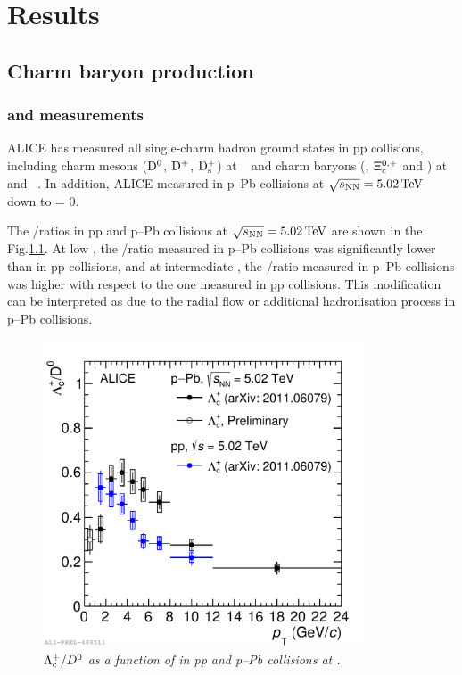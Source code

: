 \chapter{Results}
\section{Charm baryon production}
\subsection{\Lc and \Sc measurements}
ALICE has measured all single-charm hadron ground states in pp collisions, including charm mesons ($\rm D^{0}$, $\rm D^{+}$, $\rm D_{s}^{+}$) at \tevf~\cite{nonpromptD} and charm baryons (\Lc, $\rm \Xi_{\rm c}^{0,+}$ and \Oc) at \tevf and \tevt~\cite{Acharya:2020uqi,alicecollaboration2021measurement}.
In addition, ALICE measured \Lc in p--Pb collisions at $\sqrt{s_{\rm NN}} = 5.02\,\rm TeV$  down to \pt = 0. 

The \Lc/\Do ratios in pp and p--Pb collisions at $\sqrt{s_{\rm NN}} = 5.02\,\rm TeV$ are shown in the Fig.\ref{LcFig}.
At low \pt, the \Lc/\Do ratio measured in p--Pb collisions was significantly lower than in pp collisions, and at intermediate \pt, the \Lc/\Do ratio measured in p--Pb collisions was higher with respect to the one measured in pp collisions.
This modification can be interpreted as due to the radial flow or additional hadronisation process in p--Pb collisions.
\begin{figure}[ht!]
    \centering
    \includegraphics[width=0.85\textwidth]{fig/LcD0_Comparison_pp_pPb.pdf}
    \caption{\it $\Lambda_{\rm c}^{+}/D^{0}$ as a function of \pt in pp and p--Pb collisions at \tevf.}
    \label{LcFig}
\end{figure}

